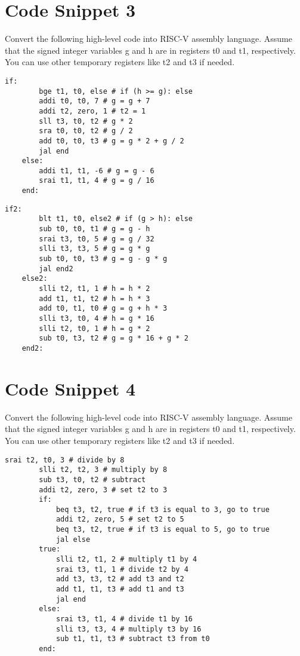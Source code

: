 \documentclass[12pt]{article}
\begin{document}
    \newpage
    \section{Code Snippet 3}
    \begin{flushleft}
        Convert the following high-level code into RISC-V assembly language. Assume
        that the signed integer variables g and h are in registers t0 and t1, respectively. You can
        use other temporary registers like t2 and t3 if needed.
    \end{flushleft}
    \begin{lstlisting}[language=RISCV]
    if: 
        bge t1, t0, else # if (h >= g): else
        addi t0, t0, 7 # g = g + 7
        addi t2, zero, 1 # t2 = 1
        sll t3, t0, t2 # g * 2
        sra t0, t0, t2 # g / 2
        add t0, t0, t3 # g = g * 2 + g / 2
        jal end
    else:
        addi t1, t1, -6 # g = g - 6
        srai t1, t1, 4 # g = g / 16
    end:
    \end{lstlisting}

    \begin{lstlisting}[language=RISCV]
    if2: 
        blt t1, t0, else2 # if (g > h): else
        sub t0, t0, t1 # g = g - h
        srai t3, t0, 5 # g = g / 32
        slli t3, t3, 5 # g = g * g
        sub t0, t0, t3 # g = g - g * g
        jal end2
    else2:
        slli t2, t1, 1 # h = h * 2
        add t1, t1, t2 # h = h * 3
        add t0, t1, t0 # g = g + h * 3
        slli t3, t0, 4 # h = g * 16
        slli t2, t0, 1 # h = g * 2
        sub t0, t3, t2 # g = g * 16 + g * 2
    end2:
        \end{lstlisting}
    \newpage
    \section{Code Snippet 4}
    \begin{flushleft}
        Convert the following high-level code into RISC-V assembly language. Assume
        that the signed integer variables g and h are in registers t0 and t1, respectively. You can
        use other temporary registers like t2 and t3 if needed.
    \end{flushleft}
    \begin{lstlisting}[language=RISCV]
        srai t2, t0, 3 # divide by 8
        slli t2, t2, 3 # multiply by 8
        sub t3, t0, t2 # subtract
        addi t2, zero, 3 # set t2 to 3
        if:
            beq t3, t2, true # if t3 is equal to 3, go to true
            addi t2, zero, 5 # set t2 to 5
            beq t3, t2, true # if t3 is equal to 5, go to true
            jal else
        true:
            slli t2, t1, 2 # multiply t1 by 4
            srai t3, t1, 1 # divide t2 by 4
            add t3, t3, t2 # add t3 and t2
            add t1, t1, t3 # add t1 and t3
            jal end
        else:
            srai t3, t1, 4 # divide t1 by 16
            slli t3, t3, 4 # multiply t3 by 16
            sub t1, t1, t3 # subtract t3 from t0
        end:
    \end{lstlisting}
\end{document}
